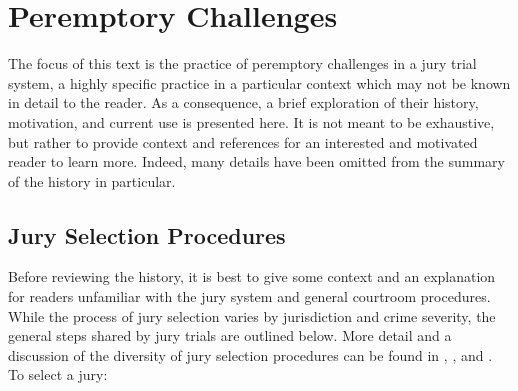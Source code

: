 \chapter{Peremptory Challenges} \label{c:background}

The focus of this text is the practice of peremptory challenges in a jury trial system, a highly specific practice in a particular
context which may not be known in detail to the reader. As a consequence, a brief exploration of their history, motivation, and
current use is presented here. It is not meant to be exhaustive, but rather to provide context and references for an interested
and motivated reader to learn more. Indeed, many details have been omitted from the summary of the history in particular.

\section{Jury Selection Procedures} \label{sec:jurysel}

Before reviewing the history, it is best to give some context and an explanation for readers unfamiliar with the jury system and
general courtroom procedures. While the process of jury selection varies by jurisdiction and crime severity, the general steps
shared by jury trials are outlined below. More detail and a discussion of the diversity of jury selection procedures can be found
in \cite{ford2010}, \cite{hansvidjudging}, and \cite{vandykejurysel}. To select a jury:

